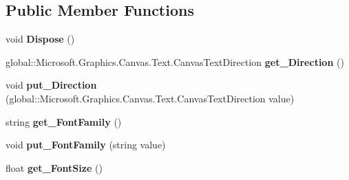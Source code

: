 \subsection*{Public Member Functions}
\begin{DoxyCompactItemize}
\item 
\mbox{\label{class_microsoft_1_1_graphics_1_1_canvas_1_1_text_1_1_canvas_text_format_a174c6d766e1732425a63a7ee7ca6a9bb}} 
void {\bfseries Dispose} ()
\item 
\mbox{\label{class_microsoft_1_1_graphics_1_1_canvas_1_1_text_1_1_canvas_text_format_a47023dedd64cd980189d5fc8fe614629}} 
global\+::\+Microsoft.\+Graphics.\+Canvas.\+Text.\+Canvas\+Text\+Direction {\bfseries get\+\_\+\+Direction} ()
\item 
\mbox{\label{class_microsoft_1_1_graphics_1_1_canvas_1_1_text_1_1_canvas_text_format_a345d3dff62bda0ba2440e40e7a5abbc6}} 
void {\bfseries put\+\_\+\+Direction} (global\+::\+Microsoft.\+Graphics.\+Canvas.\+Text.\+Canvas\+Text\+Direction value)
\item 
\mbox{\label{class_microsoft_1_1_graphics_1_1_canvas_1_1_text_1_1_canvas_text_format_a49be7f6687260bafd4e46d160d645c7c}} 
string {\bfseries get\+\_\+\+Font\+Family} ()
\item 
\mbox{\label{class_microsoft_1_1_graphics_1_1_canvas_1_1_text_1_1_canvas_text_format_a7b755c0c506c4ca08e5019ddb932ce37}} 
void {\bfseries put\+\_\+\+Font\+Family} (string value)
\item 
\mbox{\label{class_microsoft_1_1_graphics_1_1_canvas_1_1_text_1_1_canvas_text_format_a373a244b91f0a4a9b07a9757f2abd097}} 
float {\bfseries get\+\_\+\+Font\+Size} ()
\item 
\mbox{\label{class_microsoft_1_1_graphics_1_1_canvas_1_1_text_1_1_canvas_text_format_a218056f08c9d5a288afaaa910a6dcf20}} 

\end{DoxyCompactItemize}
